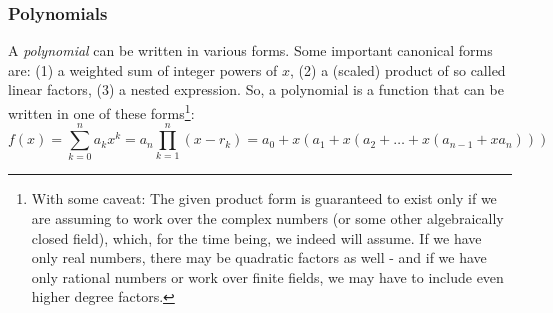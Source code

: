 \subsubsection{Polynomials}
A \emph{polynomial} can be written in various forms. Some important canonical forms are: (1) a weighted sum of integer powers of $x$, (2) a (scaled) product of so called linear factors, (3) a nested expression. So, a polynomial is a function that can be written in one of these forms\footnote{With some caveat: The given product form is guaranteed to exist only if we are assuming to work over the complex numbers (or some other algebraically closed field), which, for the time being, we indeed will assume. If we have only real numbers, there may be quadratic factors as well - and if we have only rational numbers or work over finite fields, we may have to include even higher degree factors.}:
\begin{equation}
 f(x) = \sum_{k=0}^n a_k x^k 
      = a_n \prod_{k=1}^{n} (x - r_k)
      = a_0 + x(a_1 + x(a_2 + \ldots + x(a_{n-1} + x a_n)))
\end{equation}
